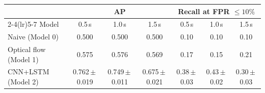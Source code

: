 \begin{tabular}{@{}lcccccc@{}}
\toprule
 & \multicolumn{3}{c}{AP} & \multicolumn{3}{c}{Recall at FPR $\leq 10\%$} \\
\cmidrule(lr){2-4}\cmidrule(lr){5-7}
Model & 0.5\,s & 1.0\,s & 1.5\,s & 0.5\,s & 1.0\,s & 1.5\,s \\
\midrule
Naive (Model 0) & 0.500 & 0.500 & 0.500 & 0.10 & 0.10 & 0.10 \\
Optical flow (Model 1) & 0.575 & 0.576 & 0.569 & 0.17 & 0.15 & 0.21 \\
CNN+LSTM (Model 2) & 0.762\,$\pm$\,0.019 & 0.749\,$\pm$\,0.011 & 0.675\,$\pm$\,0.021 & 0.38\,$\pm$\,0.03 & 0.43\,$\pm$\,0.02 & 0.30\,$\pm$\,0.03 \\
\bottomrule
\end{tabular}

